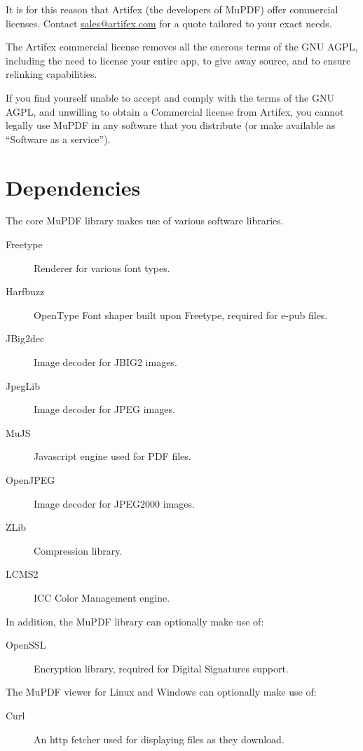 \documentclass[oneside]{book}
\begin{document}
It is for this reason that Artifex (the developers of MuPDF) offer commercial licenses. Contact \href{mailto:sales@artifex.com}{sales@artifex.com} for a quote tailored to your exact needs.

The Artifex commercial license removes all the onerous terms of the GNU AGPL, including the need to license your entire app, to give away source, and to ensure relinking capabilities.

If you find yourself unable to accept and comply with the terms of the GNU AGPL, and unwilling to obtain a Commercial license from Artifex, you cannot legally use MuPDF in any software that you distribute (or make available as ``Software as a service'').


\section{Dependencies}

The core MuPDF library makes use of various software libraries.

\begin{description}
\item[Freetype] Renderer for various font types.
\item[Harfbuzz] OpenType Font shaper built upon Freetype, required for e-pub files.
\item[JBig2dec] Image decoder for JBIG2 images.
\item[JpegLib] Image decoder for JPEG images.
\item[MuJS] Javascript engine used for PDF files.
\item[OpenJPEG] Image decoder for JPEG2000 images.
\item[ZLib] Compression library.
\item[LCMS2] ICC Color Management engine.
\end{description}

In addition, the MuPDF library can optionally make use of:

\begin{description}
\item[OpenSSL] Encryption library, required for Digital Signatures support.
\end{description}

The MuPDF viewer for Linux and Windows can optionally make use of:

\begin{description}
\item[Curl] An http fetcher used for displaying files as they download.
\end{description}
\end{document}
